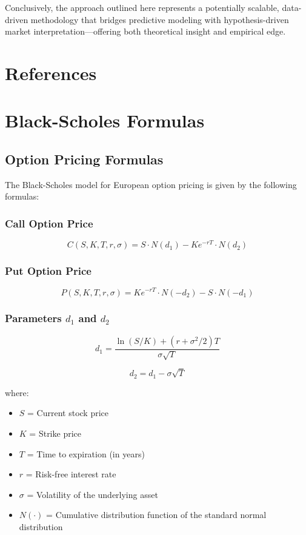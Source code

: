 \documentclass{article}
\begin{document}
Conclusively, the approach outlined here represents a potentially scalable, data-driven methodology that bridges predictive modeling with hypothesis-driven market interpretation—offering both theoretical insight and empirical edge.

\section{References}



\appendix
\section{Black-Scholes Formulas}
\subsection{Option Pricing Formulas}
The Black-Scholes model for European option pricing is given by the following formulas:

\subsubsection{Call Option Price}
\begin{equation}
C(S, K, T, r, \sigma) = S \cdot N(d_1) - K e^{-rT} \cdot N(d_2)
\end{equation}

\subsubsection{Put Option Price}
\begin{equation}
P(S, K, T, r, \sigma) = K e^{-rT} \cdot N(-d_2) - S \cdot N(-d_1)
\end{equation}

\subsubsection{Parameters $d_1$ and $d_2$}
\begin{equation}
d_1 = \frac{\ln(S/K) + (r + \sigma^2/2)T}{\sigma\sqrt{T}}
\end{equation}

\begin{equation}
d_2 = d_1 - \sigma\sqrt{T}
\end{equation}

where:
\begin{itemize}
  \item $S$ = Current stock price
  \item $K$ = Strike price
  \item $T$ = Time to expiration (in years)
  \item $r$ = Risk-free interest rate
  \item $\sigma$ = Volatility of the underlying asset
  \item $N(\cdot)$ = Cumulative distribution function of the standard normal distribution
\end{itemize}
\end{document}
